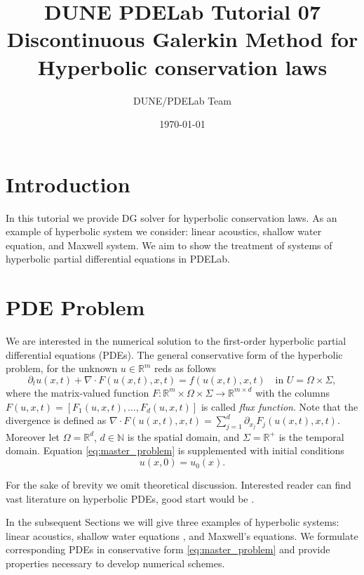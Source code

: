 \documentclass[a4paper,12pt]{article}
\title{DUNE PDELab Tutorial 07 \\
Discontinuous Galerkin Method for Hyperbolic conservation laws}
\author{DUNE/PDELab Team}
\date{\today}
\theoremstyle{definition}
\theoremstyle{definition}
\newcommand{\Dim}{d}
\begin{document}
\maketitle
\tableofcontents
\clearpage

\section{Introduction}

In this tutorial we provide  DG solver for hyperbolic conservation laws. As an example of hyperbolic system we consider: linear acoustics, shallow water equation, and Maxwell system. We aim to show the
treatment of systems of hyperbolic partial differential equations in PDELab.

\section{PDE Problem}

We are interested in the numerical solution to the first-order
hyperbolic partial differential equations (PDEs). The general conservative form of the hyperbolic problem,  for  the unknown $u\in\mathbb{R}^m$
reds as follows
\begin{equation}
\label{eq:master_problem}
\partial_t u(x,t) + \nabla\cdot F(u(x,t),x,t) = f(u(x,t),x,t)  \quad\text{in $U=\Omega\times\Sigma$} ,
\end{equation}
where the matrix-valued function $F : \mathbb{R}^m\times\Omega\times\Sigma \to \mathbb{R}^{m\times \Dim}$
with the columns $F(u,x,t) = [F_1(u,x,t),\ldots,F_d(u,x,t)]$ is called \textit{flux function}.
Note that the divergence is defined as $\nabla\cdot F(u(x,t),x,t) = \sum_{j=1}^{\Dim} \partial_{x_j} F_j(u(x,t),x,t)$.
Moreover let $\Omega=\mathbb{R}^{\Dim}$, $\Dim\in\mathbb{N}$ is the spatial domain,  and $\Sigma=\mathbb{R}^+$ is the temporal domain. Equation \eqref{eq:master_problem} is supplemented with initial conditions
\begin{equation*}
u(x,0) = u_0(x) .
\end{equation*}


For the sake of brevity we omit theoretical discussion.
Interested reader can find vast literature on hyperbolic PDEs, good start would be \cite[Chapter 11]{Evans}.

In the subsequent Sections we will give three examples of hyperbolic systems: linear acoustics, shallow water equations , and Maxwell's equations. We formulate corresponding PDEs in conservative form \eqref{eq:master_problem} and provide properties necessary to develop numerical schemes.
\end{document}
